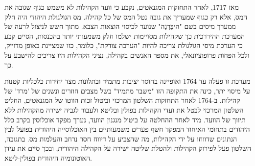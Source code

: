 מאז 1717, לאחר התחזקות המגנאטים, נקבע כי וועד הקהילות לא משמש כגוף שגובה את המס, אלא רק כגוף שמעריך את גובה נטל המס של כל קהילה. מס הגולגולת היהודי היה חלק ממערך מיסים בשם "היבֶּרְנַה" שנועד לכיסוי הוצאות הצבא. מתוך חשש לניצול לרעה של המערכת ההיררכית כך שקהילות מסויימות ישלמו חלק משמעותי יותר בהכנסות, הסיים קבע כי הערכת מיסי הגולגולת צריכה להיות "הערכה צודקת", כלומר, כזו שמציינת באופן מדוייק, ולכל הפחות פרופוציונאלי, את מספר האנשים בקהילה, נציגי הקהילות היו צריכים להישבע על כך. 

מערכת זו פעלה עד 1764 ואופיינה בחוסר יציבות מתמיד ובתלונות מצד יחידות כלכליות קטנות על מיסוי יתר, \citep{kazmierczyk_permanent_2022}  כינה את התקופה הזו "משבר מתמיד" בשל מצבים חוזרים ונשנים של 'מרד' של קהילות. ב-1764 לאחר התחזקות השלטון המרכזי וביטול זכות הווטו של המגנאטים, החליט השלטון המרכזי לבטל את ועדי הקהילות בפולין ובליטא ולעבור לגביה ישירה מהקהילות ללא תיווך של הוועד. מיד לאחר ההחלטה על ביטול מנגנון הוועד, נערך מפקד אוכלוסין בקרב כלל היהודים בתחומי האיחוד
המפקד חשף פערים משמעותיים בין האוכלוסייה היהודית בפועל לבין הנתונים שדווחו על ידי הקהילות, מה שהצביע על דיווח חסר נרחב והעלמות מס. בתגובה, השלטון פעל לפירוק הקהילות ולהטלת שליטה ישירה על הקהילה היהודית, ובכך סיים את עידן האוטונומיה היהודית בפולין-ליטא.




